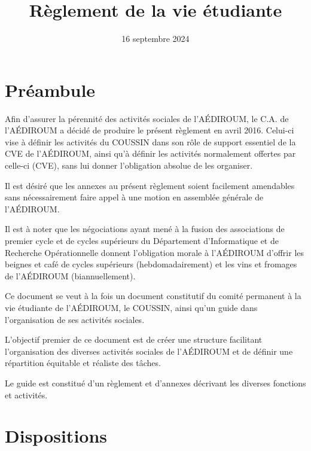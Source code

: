 \documentclass{aediroum}
\title{Règlement de la vie étudiante}
\date{16 septembre 2024}
\begin{document}
\maketitle

\section{Préambule}\label{sec:preambule}
Afin d'assurer la pérennité des activités sociales de l'AÉDIROUM, le C.A. de l'AÉDIROUM a décidé de produire le présent règlement en avril 2016. Celui-ci vise à définir les activités du COUSSIN dans son rôle de support essentiel de la CVE de l'AÉDIROUM, ainsi qu'à définir les activités normalement offertes par celle-ci (CVE), sans lui donner l'obligation absolue de les organiser.

Il est désiré que les annexes au présent règlement soient facilement amendables sans nécessairement faire appel à une motion en assemblée générale de l'AÉDIROUM.

Il est à noter que les négociations ayant mené à la fusion des associations de premier cycle et de cycles supérieurs du Département d'Informatique et de Recherche Opérationnelle donnent l'obligation morale à l'AÉDIROUM d'offrir les beignes et café de cycles supérieurs (hebdomadairement) et les vins et fromages de l'AÉDIROUM (biannuellement).

Ce document se veut à la fois un document constitutif du comité permanent à la vie étudiante de l'AÉDIROUM, le COUSSIN, ainsi qu'un guide dans l'organisation de ses activités sociales.

L'objectif premier de ce document est de créer une structure facilitant l'organisation des diverses activités sociales de l'AÉDIROUM et de définir une répartition équitable et réaliste des tâches.

Le guide est constitué d'un règlement et d'annexes décrivant les diverses fonctions et activités.

\section{Dispositions}\label{sec:dispositions}
\end{document}
